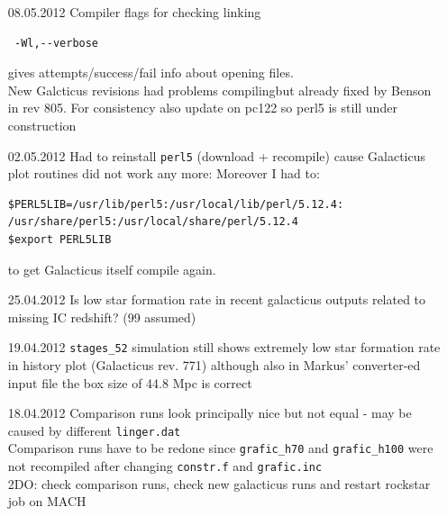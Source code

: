 \begin{itemize}
\item[08.05.2012]
Compiler flags for checking linking 
\begin{verbatim}
 -Wl,--verbose
\end{verbatim}
gives attempts/success/fail info about opening files. \\
New Galcticus revisions had problems compilingbut already 
fixed by Benson in rev 805. For consistency also update 
on pc122 so perl5 is still under construction \\

\item[02.05.2012]
Had to reinstall \texttt{perl5} (download + recompile) 
cause Galacticus plot routines did not work any more: 
Moreover I had to: 
\begin{verbatim}
$PERL5LIB=/usr/lib/perl5:/usr/local/lib/perl/5.12.4:
/usr/share/perl5:/usr/local/share/perl/5.12.4
$export PERL5LIB
\end{verbatim}
to get Galacticus itself compile again. \\

\item[25.04.2012]
Is low star formation rate in recent galacticus outputs 
related to missing IC redshift? (99 assumed) \\

\item[19.04.2012]
\texttt{stages\_52} simulation still shows extremely low 
star formation rate in history plot (Galacticus rev. 771) 
although also in Markus' converter-ed input file the box 
size of 44.8 Mpc is correct \\ 


\item[18.04.2012]
Comparison runs look principally nice but not equal - may be 
caused by different \texttt{linger.dat} \\
Comparison runs have to be redone since \texttt{grafic\_h70}
and \texttt{grafic\_h100} were 
not recompiled after changing \texttt{constr.f} and \texttt{grafic.inc} \\
2DO: check comparison runs, check new galacticus runs and 
restart rockstar job on MACH \\


\end{itemize}
